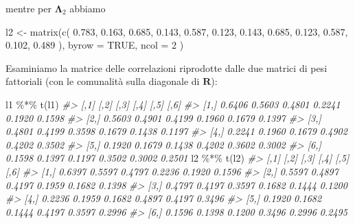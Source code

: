 \documentclass[
  11pt,
]{krantz}
\makeatletter
\newenvironment{Shaded}{\begin{snugshade}}{\end{snugshade}}
\newcommand{\AttributeTok}[1]{\textcolor[rgb]{0.61,0.61,0.61}{#1}}
\newcommand{\CommentTok}[1]{\textcolor[rgb]{0.37,0.37,0.37}{\textit{#1}}}
\newcommand{\ConstantTok}[1]{\textcolor[rgb]{0,0,0}{#1}}
\newcommand{\DecValTok}[1]{\textcolor[rgb]{0.06,0.06,0.06}{#1}}
\newcommand{\FloatTok}[1]{\textcolor[rgb]{0.06,0.06,0.06}{#1}}
\newcommand{\FunctionTok}[1]{\textcolor[rgb]{0,0,0}{#1}}
\newcommand{\NormalTok}[1]{#1}
\newcommand{\OtherTok}[1]{\textcolor[rgb]{0.37,0.37,0.37}{#1}}
\newcommand{\SpecialCharTok}[1]{\textcolor[rgb]{0,0,0}{#1}}
\newenvironment{kframe}{%
\medskip{}
\setlength{\fboxsep}{.8em}
 \def\at@end@of@kframe{}%
 \ifinner\ifhmode%
  \def\at@end@of@kframe{\end{minipage}}%
  \begin{minipage}{\columnwidth}%
 \fi\fi%
 \def\FrameCommand##1{\hskip\@totalleftmargin \hskip-\fboxsep
 \colorbox{shadecolor}{##1}\hskip-\fboxsep
     \hskip-\linewidth \hskip-\@totalleftmargin \hskip\columnwidth}%
 \MakeFramed {\advance\hsize-\width
   \@totalleftmargin\z@ \linewidth\hsize
   \@setminipage}}%
 {\par\unskip\endMakeFramed%
 \at@end@of@kframe}
\renewenvironment{Shaded}{\begin{kframe}}{\end{kframe}}
\theoremstyle{definition}
\theoremstyle{definition}
\theoremstyle{definition}
\theoremstyle{definition}
\theoremstyle{remark}
\makeatother
\begin{document}
mentre per \(\boldsymbol{\Lambda}_2\) abbiamo

\begin{Shaded}
\begin{Highlighting}[]
\NormalTok{l2 }\OtherTok{\textless{}{-}} \FunctionTok{matrix}\NormalTok{(}\FunctionTok{c}\NormalTok{(}
  \FloatTok{0.783}\NormalTok{,  }\FloatTok{0.163}\NormalTok{,}
  \FloatTok{0.685}\NormalTok{,  }\FloatTok{0.143}\NormalTok{,}
  \FloatTok{0.587}\NormalTok{,  }\FloatTok{0.123}\NormalTok{,}
  \FloatTok{0.143}\NormalTok{,  }\FloatTok{0.685}\NormalTok{,}
  \FloatTok{0.123}\NormalTok{,  }\FloatTok{0.587}\NormalTok{,}
  \FloatTok{0.102}\NormalTok{,  }\FloatTok{0.489}
\NormalTok{),}
\AttributeTok{byrow =} \ConstantTok{TRUE}\NormalTok{, }\AttributeTok{ncol =} \DecValTok{2}
\NormalTok{)}
\end{Highlighting}
\end{Shaded}

Esaminiamo la matrice delle correlazioni riprodotte dalle due matrici di pesi fattoriali (con le comunalità sulla diagonale di \(\boldsymbol{R}\)):

\begin{Shaded}
\begin{Highlighting}[]
\NormalTok{l1 }\SpecialCharTok{\%*\%} \FunctionTok{t}\NormalTok{(l1)}
\CommentTok{\#\textgreater{}        [,1]   [,2]   [,3]   [,4]   [,5]   [,6]}
\CommentTok{\#\textgreater{} [1,] 0.6406 0.5603 0.4801 0.2241 0.1920 0.1598}
\CommentTok{\#\textgreater{} [2,] 0.5603 0.4901 0.4199 0.1960 0.1679 0.1397}
\CommentTok{\#\textgreater{} [3,] 0.4801 0.4199 0.3598 0.1679 0.1438 0.1197}
\CommentTok{\#\textgreater{} [4,] 0.2241 0.1960 0.1679 0.4902 0.4202 0.3502}
\CommentTok{\#\textgreater{} [5,] 0.1920 0.1679 0.1438 0.4202 0.3602 0.3002}
\CommentTok{\#\textgreater{} [6,] 0.1598 0.1397 0.1197 0.3502 0.3002 0.2501}
\NormalTok{l2 }\SpecialCharTok{\%*\%} \FunctionTok{t}\NormalTok{(l2)}
\CommentTok{\#\textgreater{}        [,1]   [,2]   [,3]   [,4]   [,5]   [,6]}
\CommentTok{\#\textgreater{} [1,] 0.6397 0.5597 0.4797 0.2236 0.1920 0.1596}
\CommentTok{\#\textgreater{} [2,] 0.5597 0.4897 0.4197 0.1959 0.1682 0.1398}
\CommentTok{\#\textgreater{} [3,] 0.4797 0.4197 0.3597 0.1682 0.1444 0.1200}
\CommentTok{\#\textgreater{} [4,] 0.2236 0.1959 0.1682 0.4897 0.4197 0.3496}
\CommentTok{\#\textgreater{} [5,] 0.1920 0.1682 0.1444 0.4197 0.3597 0.2996}
\CommentTok{\#\textgreater{} [6,] 0.1596 0.1398 0.1200 0.3496 0.2996 0.2495}
\end{Highlighting}
\end{Shaded}
\end{document}
